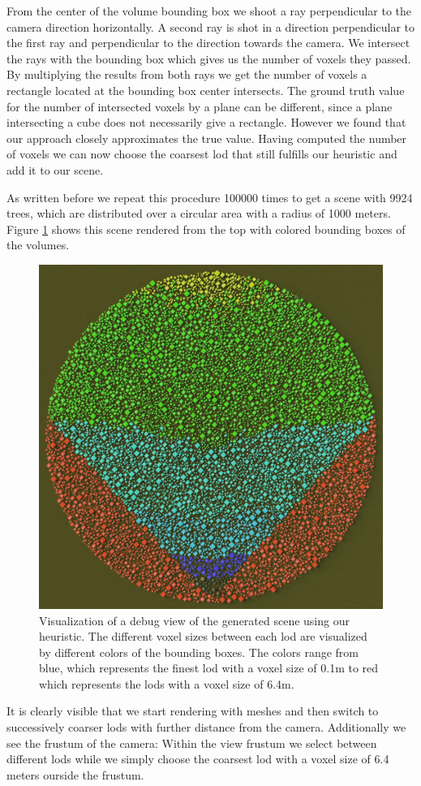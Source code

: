 From the center of the volume bounding box we shoot a ray perpendicular to the camera direction horizontally.
A second ray is shot in a direction perpendicular to the first ray and perpendicular to the direction towards the camera.
We intersect the rays with the bounding box which gives us the number of voxels they passed.
By multiplying the results from both rays we get the number of voxels a rectangle located at the bounding box center intersects.
The ground truth value for the number of intersected voxels by a plane can be different, since a plane intersecting a cube does not necessarily give a rectangle.
However we found that our approach closely approximates the true value.
Having computed the number of voxels we can now choose the coarsest \ac{lod} that still fulfills our heuristic and add it to our scene.

As written before we repeat this procedure 100000 times to get a scene with 9924 trees, which are distributed over a circular area with a radius of 1000 meters.
Figure \ref{fig:visualize_lods} shows this scene rendered from the top with colored bounding boxes of the volumes.
\begin{figure}[ht]
    \centering
    \includegraphics[width=0.5\linewidth]{img/visualize_lods.jpg}
    \caption[Visualization of a \ac{lod} scene]{Visualization of a debug view of the generated scene using our heuristic. The different voxel sizes between each \ac{lod} are visualized by different colors of the bounding boxes. The colors range from blue, which represents the finest \ac{lod} with a voxel size of 0.1m to red which represents the \acsp{lod} with a voxel size of 6.4m.}
    \label{fig:visualize_lods}
\end{figure}
It is clearly visible that we start rendering with meshes and then switch to successively coarser \acsp{lod} with further distance from the camera.
Additionally we see the frustum of the camera: Within the view frustum we select between different \acsp{lod} while we simply choose the coarsest \ac{lod} with a voxel size of 6.4 meters ourside the frustum.


